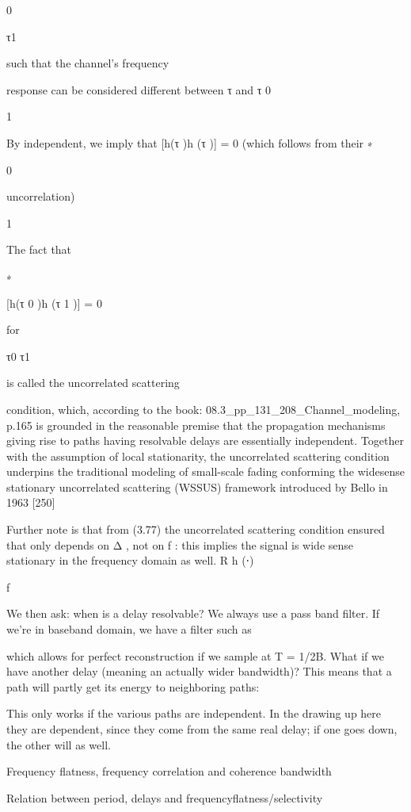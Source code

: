 {{{{0

\neq τ1

such that the channel's frequency

response can be considered different between τ and τ 0

1

By independent, we imply that [h(τ )h (τ )] = 0 (which follows from their
∗

0

uncorrelation)

1

The fact that

∗

[h(τ 0 )h (τ 1 )] = 0

for

τ0 \neq τ1

is called the uncorrelated scattering

condition, which, according to the book:
08.3_pp_131_208_Channel_modeling, p.165 is grounded in the reasonable premise that the propagation mechanisms giving rise to paths having resolvable delays are essentially independent. Together with the assumption of local stationarity, the uncorrelated scattering condition underpins the traditional modeling of small-scale fading conforming the widesense stationary uncorrelated scattering (WSSUS) framework introduced by Bello in 1963 [250]

Further note is that from (3.77) the uncorrelated scattering condition ensured that only depends on Δ , not on f : this implies the signal is wide sense stationary in the frequency domain as well.
R h (⋅)

f

We then ask: when is a delay resolvable? We always use a pass band filter. If we're in baseband domain, we have a filter such as

which allows for perfect reconstruction if we sample at T = 1/2B.
What if we have another delay (meaning an actually wider bandwidth)? This means that a path will partly get its energy to neighboring paths:

This only works if the various paths are independent.
In the drawing up here they are dependent, since they come from the same real delay; if one goes down, the other will as well.

Frequency flatness,
frequency correlation and coherence bandwidth

Relation between period, delays and frequencyflatness/selectivity



}}}}

